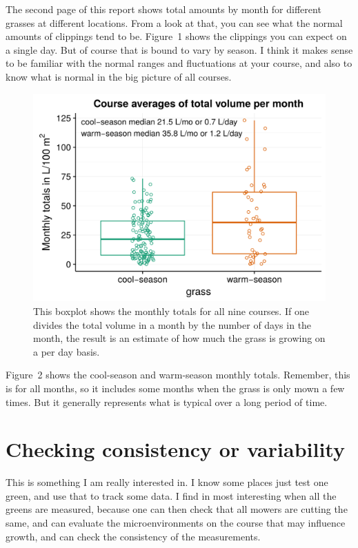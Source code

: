 \documentclass[12pt,b5,]{tufte-book}
\begin{document}
The second page of this report shows total amounts by month for
different grasses at different locations. From a look at that, you can
see what the normal amounts of clippings tend to be.
Figure~1 shows the clippings you can expect on a single
day. But of course that is bound to vary by season. I think it makes
sense to be familiar with the normal ranges and fluctuations at your
course, and also to know what is normal in the big picture of all
courses.

\begin{figure}
\centering
\includegraphics{figs/boxMo.png}
\caption{This boxplot shows the monthly totals for all nine courses. If one
divides the total volume in a month by the number of days in the month,
the result is an estimate of how much the grass is growing on a per day
basis.}
\end{figure}

Figure~2 shows the cool-season and warm-season monthly
totals. Remember, this is for all months, so it includes some months
when the grass is only mown a few times. But it generally represents
what is typical over a long period of time.

\hypertarget{checking-consistency-or-variability}{%
\section{Checking consistency or variability}\label{checking-consistency-or-variability}}

This is something I am really interested in. I know some places just
test one green, and use that to track some data. I find in most
interesting when all the greens are measured, because one can then check
that all mowers are cutting the same, and can evaluate the
microenvironments on the course that may influence growth, and can check
the consistency of the measurements.
\end{document}
